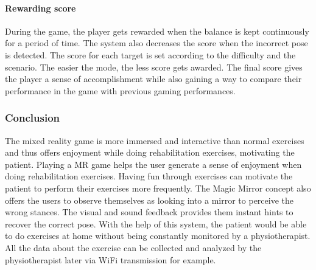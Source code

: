 \paragraph{Rewarding score} During the game, the player gets rewarded when the balance is kept continuously for a period of time. The system also decreases the score when the incorrect pose is detected. 
The score for each target is set according to the difficulty and the scenario. The easier the mode, the less score gets awarded. The final score gives the player a sense of accomplishment while also gaining a way to compare their performance in the game with previous gaming performances. 

\subsubsection{Conclusion}
The mixed reality game is more immersed and interactive than normal exercises and thus offers enjoyment while doing rehabilitation exercises, motivating the patient. Playing a MR game helps the user generate a sense of enjoyment when doing rehabilitation exercises. Having fun through exercises can motivate the patient to perform their exercises more frequently. The Magic Mirror concept also offers the users to observe themselves as looking into a mirror to perceive the wrong stances. The visual and sound feedback provides them instant hints to recover the correct pose. With the help of this system, the patient would be able to do exercises at home without being constantly monitored by a physiotherapist. All the data about the exercise can be collected and analyzed by the physiotherapist later via WiFi transmission for example.